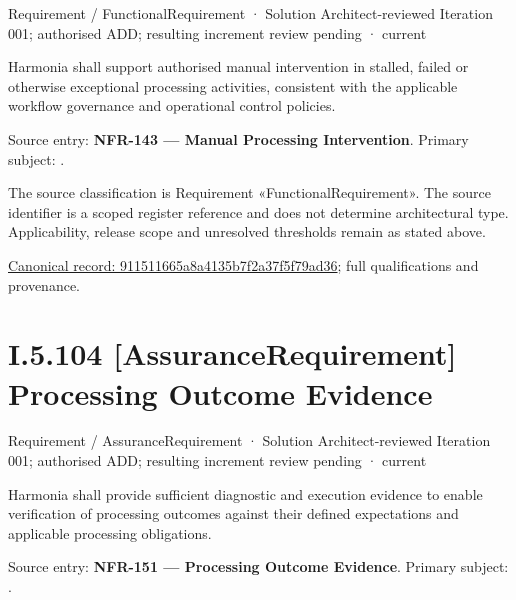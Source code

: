 \label{element:911511665a8a4135b7f2a37f5f79ad36}
{\small Requirement / FunctionalRequirement · Solution Architect-reviewed Iteration 001; authorised ADD; resulting increment review pending · current}\par

Harmonia shall support authorised manual intervention in stalled, failed or otherwise exceptional processing activities, consistent with the applicable workflow governance and operational control policies.



Source entry: \textbf{NFR-143 — Manual Processing Intervention}. Primary subject: \texttt{}.



The source classification is Requirement «FunctionalRequirement». The source identifier is a scoped register reference and does not determine architectural type. Applicability, release scope and unresolved thresholds remain as stated above.


{\footnotesize \href{../../../../../../../../continuum/motivation/requirement/functional-requirement/911511665a8a4135b7f2a37f5f79ad36.md}{Canonical record: 911511665a8a4135b7f2a37f5f79ad36}; full qualifications and provenance.}\par
\section*{I.5.104 [AssuranceRequirement] Processing Outcome Evidence}
\label{navigation:I.5.104}

\label{element:8ac5880576ad4f8fa9612f231178a06c}
{\small Requirement / AssuranceRequirement · Solution Architect-reviewed Iteration 001; authorised ADD; resulting increment review pending · current}\par

Harmonia shall provide sufficient diagnostic and execution evidence to enable verification of processing outcomes against their defined expectations and applicable processing obligations.



Source entry: \textbf{NFR-151 — Processing Outcome Evidence}. Primary subject: \texttt{}.



